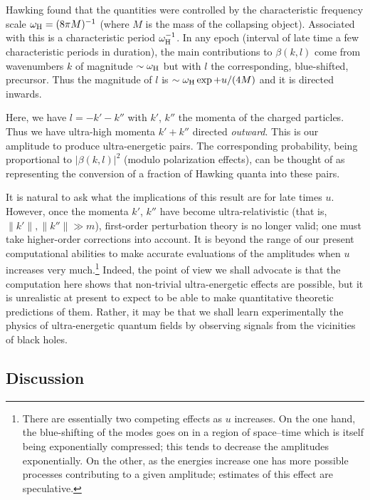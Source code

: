 \documentclass[11pt]{article}
\begin{document}
Hawking found that the quantities were controlled by the characteristic 
frequency scale $\omega _{\rm H}=(8\pi M)^{-1}$ (where $M$ is the mass of the
collapsing object).  Associated with this is a characteristic period $\omega
_{\rm H}^{-1}$.  In any epoch (interval of late time a few characteristic
periods in duration), the main contributions to $\beta (k,l)$ come from
wavenumbers $k$ of magnitude $\sim \omega _{\rm H}$ but with $l$ the
corresponding, blue-shifted, precursor.  Thus the magnitude of $l$ is $\sim
\omega _{\rm H}\exp +u/(4M)$ and it is directed inwards.

Here, we have $l=-k'-k''$ with $k'$, $k''$ the momenta of the charged
particles. Thus we have ultra-high momenta $k'+k''$ directed {\em outward}. 
This is our amplitude to produce ultra-energetic pairs. The corresponding
probability, being proportional to $|\beta (k,l)|^2$ (modulo polarization
effects), can be thought of as representing the conversion of a fraction of
Hawking quanta into these pairs.

It is natural to ask what the implications of this result are for late
times $u$. 
However, once the momenta $k'$, $k''$ have become ultra-relativistic
(that
is, $\| k'\| ,\| k''\|\gg m$), first-order perturbation theory is no longer
valid; one must take higher-order corrections into account.  It is beyond the
range of our present computational abilities to make accurate evaluations of the
amplitudes when $u$ increases very much.\footnote{There are essentially two
competing effects as $u$ increases.  On the one hand, the blue-shifting of the
modes 
goes on in a region of
space--time which is itself being exponentially compressed; this tends to
decrease the amplitudes exponentially.  On the other, as the energies increase
one has more possible processes contributing to a given amplitude; estimates
of this effect are speculative.}
Indeed, the point of view we shall
advocate is that the computation here shows that non-trivial
ultra-energetic effects are possible, but it is unrealistic at present to expect
to be able to make quantitative theoretic predictions of them.  Rather, it may
be that we shall learn experimentally the physics of ultra-energetic quantum
fields by observing signals from the vicinities of black holes.


\subsection{Discussion}
\label{dis}
\end{document}
